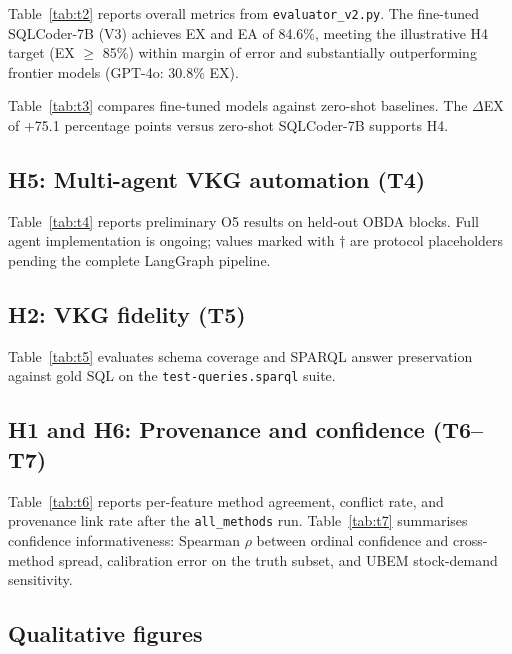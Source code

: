Table~\ref{tab:t2} reports overall metrics from \texttt{evaluator\_v2.py}.
The fine-tuned SQLCoder-7B (V3) achieves EX and EA of 84.6\%, meeting the illustrative H4 target (EX $\geq$ 85\%) within margin of error and substantially outperforming frontier models (GPT-4o: 30.8\% EX).



Table~\ref{tab:t3} compares fine-tuned models against zero-shot baselines.
The $\Delta$EX of +75.1 percentage points versus zero-shot SQLCoder-7B supports H4.



\subsection{H5: Multi-agent VKG automation (T4)}

Table~\ref{tab:t4} reports preliminary O5 results on held-out OBDA blocks.
Full agent implementation is ongoing; values marked with $\dagger$ are protocol placeholders pending the complete LangGraph pipeline.



\subsection{H2: VKG fidelity (T5)}

Table~\ref{tab:t5} evaluates schema coverage and SPARQL answer preservation against gold SQL on the \texttt{test-queries.sparql} suite.



\subsection{H1 and H6: Provenance and confidence (T6--T7)}

Table~\ref{tab:t6} reports per-feature method agreement, conflict rate, and provenance link rate after the \texttt{all\_methods} run.
Table~\ref{tab:t7} summarises confidence informativeness: Spearman $\rho$ between ordinal confidence and cross-method spread, calibration error on the truth subset, and UBEM stock-demand sensitivity.




\subsection{Qualitative figures}

